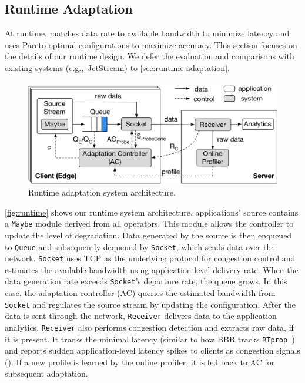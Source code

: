 \subsection{Runtime Adaptation}
\label{sec:runtime}

At runtime, \sysname{} matches data rate to available bandwidth to minimize
latency and uses Pareto-optimal configurations to maximize accuracy. This
section focuses on the details of our runtime design. We defer the evaluation
and comparisons with existing systems (e.g.,~JetStream) to
\autoref{sec:runtime-adaptation}.

\begin{figure}
  \centering
  \includegraphics[width=\linewidth]{figures/runtime-adaptation.pdf}
  \caption{Runtime adaptation system architecture.}
  \label{fig:runtime}
\end{figure}

\autoref{fig:runtime} shows our runtime system architecture. \sysname{}
applications' source contains a \texttt{Maybe} module derived from all \maybe{}
operators. This module allows the controller to update the level of
degradation. Data generated by the source is then enqueued to \texttt{Queue} and
subsequently dequeued by \texttt{Socket}, which sends data over the
network. \texttt{Socket} uses TCP as the underlying protocol for congestion
control and estimates the available bandwidth using application-level delivery
rate. When the data generation rate exceeds \texttt{Socket}'s departure rate,
the queue grows. In this case, the adaptation controller (AC) queries the
estimated bandwidth from \texttt{Socket} and regulates the source stream by
updating the configuration. After the data is sent through the network,
\texttt{Receiver} delivers data to the application analytics. \texttt{Receiver}
also performs congestion detection and extracts raw data, if it is present.  It
tracks the minimal latency (similar to how BBR tracks
\texttt{RTprop}~\cite{cardwell2017bbr}) and reports sudden application-level
latency spikes to clients as congestion signals (\rc{}). If a new profile is
learned by the online profiler, it is fed back to AC for subsequent adaptation.

